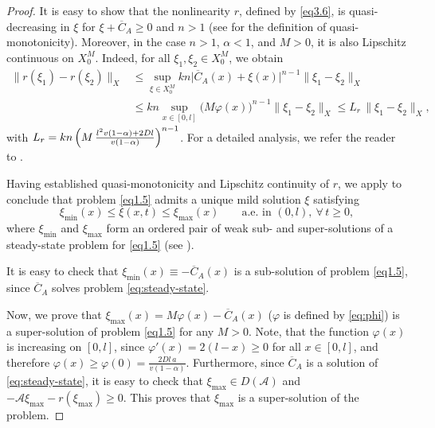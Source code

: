 \documentclass{mpi2015-cscpreprint}
\numberwithin{equation}{section}
\begin{document}
\begin{proof}

{ It is easy to show that the nonlinearity $r$, defined by \eqref{eq3.6}, 
is quasi-decreasing in $\xi$ for $\xi+\overline{C}_A\ge 0$ 
and $n>1$ (see \cite{AreDan2025} for the definition of quasi-monotonicity). 
Moreover, in the case $n>1$, $\alpha<1$, and $M>0$, it is also Lipschitz 
continuous on $X_0^M$. Indeed, for all $\xi_1,\xi_2\in X_0^M$, we obtain}
\begin{equation*}
\begin{aligned}
\|r(\xi_1)-r(\xi_2)\|_X&\leqslant \sup_{\xi\in X_0^M}
kn\big|\overline{C}_A(x)+\xi(x)\big|^{n-1}\|\xi_1-\xi_2\|_X
\\&\leqslant kn\sup_{x\in[0,l]}\big(M\varphi(x)\big)^{n-1}
\|\xi_1-\xi_2\|_X \leqslant L_r\,\|\xi_1-\xi_2\|_X,
\end{aligned}
\end{equation*}
with $L_r=kn\,\Bigl(M\,\tfrac{l^2v(1-\alpha)+2Dl}{v(1-\alpha)}\Bigr)^{n-1}$. For a detailed analysis, we refer the reader to \cite{YevZB2025}. 

{ Having established quasi-monotonicity and Lipschitz continuity of $r$, 
we apply \cite[Theorem~1.2]{AreDan2025} to conclude that problem 
\eqref{eq1.5} admits a unique mild solution $\xi$ satisfying}
\begin{equation*}
\xi_{\min}(x)\leqslant \xi(x,t)\leqslant \xi_{\max}(x) 
\qquad \text{a.e. in }(0,l),\ \forall\, t\geqslant 0,
\end{equation*}
where $\xi_{\min}$ and $\xi_{\max}$ { form an ordered pair of weak sub- and super-solutions of a steady-state problem for \eqref{eq1.5} (see \cite[Definition~1.1]{AreDan2025}).}

It is easy to check that $\xi_{\min}(x)\equiv -\overline{C}_A(x)$ is a sub-solution of problem \eqref{eq1.5}, since $\overline{C}_A$ solves problem \eqref{eq:steady-state}. 

Now, we prove that $\xi_{\max}(x)=M\varphi(x)-\overline{C}_A(x)$ ($\varphi$ is defined by \eqref{eq:phi}) is a super-solution of problem \eqref{eq1.5} for any $M>0$. 
Note, that the function $\varphi(x)$ is increasing on $[0,l]$, since $\varphi'(x)=2(l-x)\geqslant0$ for all $x\in[0,l]$, and therefore $\varphi(x)\geqslant \varphi(0)=\frac{2Dl\,a}{v(1-\alpha)}$.
Furthermore, since $\overline{C}_A$ is a solution of \eqref{eq:steady-state}, it is easy to check that $\xi_{\max}\in D(\mathcal{A})$ and  $-\mathcal{A}\xi_{\max}-r(\xi_{\max})\ge 0$.
This proves that $\xi_{\max}$ is a super-solution of the problem.
\end{proof}
\end{document}

